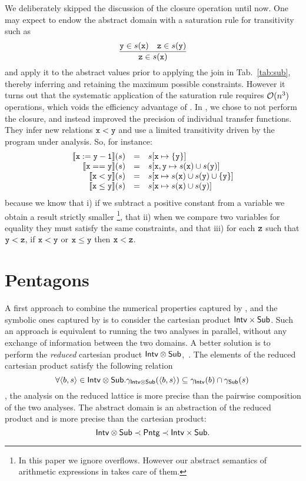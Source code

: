 \documentclass{sig-alternate}
\begin{document}
We deliberately skipped the discussion of the closure operation until now.
One may expect to endow the \SUB{} abstract domain with a
saturation rule for transitivity such as
\[
\frac{\mathtt{y} \in s(\mathtt{x}) \quad \mathtt{z} \in s(\mathtt{y})}{\mathtt{z} \in s(\mathtt{x})}
\]
and apply it to the abstract values prior to applying the join in
Tab.~\ref{tab:sub}, thereby inferring and retaining the maximum possible constraints.
However it turns out that the systematic application of the saturation
rule requires $\mathcal{O}(n^3)$ operations, which voids the efficiency
advantage of \Pentagons.
In \Clousot, we chose to not perform the closure, and instead improved
the precision of individual transfer functions.
 They infer new relations $\mathtt{x} < \mathtt{y}$ and use a limited transitivity driven by the program under analysis. 
So, for instance:
\[
\begin{array}{rcl}
\llbracket \mathtt{x := y - 1} \rrbracket(s) & = & s[\mathtt{x} \mapsto \{ \mathtt{y}\}] \\ 
\llbracket \mathtt{x == y} \rrbracket(s) & = & s[\mathtt{x}, \mathtt{y} \mapsto s(\mathtt{x}) \cup s(\mathtt{y})] \\
\llbracket \mathtt{x < y} \rrbracket(s) &=& s[\mathtt{x} \mapsto s(\mathtt{x}) \cup s(\mathtt{y}) \cup \{ \mathtt{y}\}] \\
\llbracket \mathtt{x \leq y} \rrbracket(s) &=& s[\mathtt{x} \mapsto s(\mathtt{x}) \cup s(\mathtt{y})]  
\end{array}
\]
because we know that i) if we subtract a positive constant from a
variable we obtain a result strictly smaller \footnote{In this paper
  we ignore overflows. However our abstract semantics of arithmetic
  expressions in \Clousot{} takes care of them.}, that ii) when we
compare two variables for equality they must satisfy the same
constraints, and that iii) for each $\mathtt{z}$ such that $\mathtt{y} < \mathtt{z}$, if  $\mathtt{x} < \mathtt{y}$ or $\mathtt{x} \leq \mathtt{y}$ then $\mathtt{x} < \mathtt{z}$.

\section{Pentagons}
A first approach to combine the numerical properties captured by \Intervals, and the symbolic ones captured by \SUB{} is to consider the cartesian product  $\mathsf{Intv} \times \mathsf{Sub}$.
Such an approach is equivalent to running the two analyses in parallel, without any exchange of information between the two domains.
A better solution is to perform the \emph{reduced} cartesian product $\mathsf{Intv} \otimes \mathsf{Sub}$,~\cite{CousotCousot79}.
The elements of the reduced cartesian product satisfy the following relation
 \[
\forall \langle b, s \rangle \in \mathsf{Intv} \otimes \mathsf{Sub}. \gamma_{\mathsf{Intv} \otimes \mathsf{Sub}}(\langle b, s \rangle) \subseteq \gamma_{\mathsf{Intv}}(b) \cap \gamma_{\mathsf{Sub}}(s) \,
\]
\ie, the analysis on the reduced lattice is more precise than the pairwise composition of the two analyses.
The \Pentagons{} abstract domain is an abstraction of the reduced product and is more precise than the cartesian product: 
\[
\mathsf{Intv} \otimes \mathsf{Sub} \prec \mathsf{Pntg} \prec \mathsf{Intv} \times \mathsf{Sub}.
\]
\end{document}

